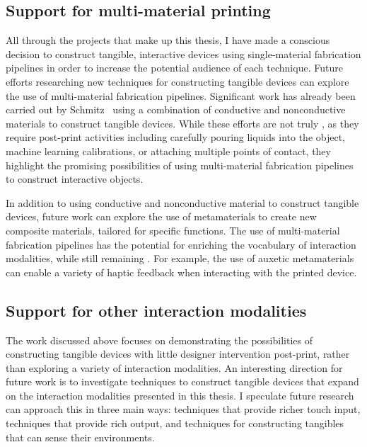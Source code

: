     \subsection{Support for multi-material printing}
      All through the projects that make up this thesis, I have made a conscious
      decision to construct tangible, interactive devices using single-material
      fabrication pipelines in order to increase the potential audience of each
      technique. Future efforts researching new \pap techniques for constructing
      tangible devices can explore the use of multi-material fabrication
      pipelines. Significant work has already been carried out by
      Schmitz~\cite{Schmitz:2019a} using a combination of conductive and
      nonconductive materials to construct tangible devices. While these efforts
      are not truly \pap, as they require post-print activities including
      carefully pouring liquids into the object, machine learning
      calibrations, or attaching multiple points of contact, they highlight the
      promising possibilities of using multi-material fabrication pipelines to
      construct interactive objects.

      In addition to using conductive and nonconductive material to construct
      tangible devices, future work can explore the use of metamaterials to
      create new composite materials, tailored for specific functions.  The use
      of multi-material fabrication pipelines has the potential for enriching
      the vocabulary of interaction modalities, while still remaining \pap.  For
      example, the use of auxetic metamaterials can enable a variety of haptic
      feedback when interacting with the printed device.

    \subsection{Support for other interaction modalities}
      The work discussed above focuses on demonstrating the possibilities of
      constructing tangible devices with little designer intervention
      post-print, rather than exploring a variety of interaction modalities. An
      interesting direction for future work is to investigate \papf techniques
      to construct tangible devices that expand on the interaction modalities
      presented in this thesis. I speculate future research can approach this in
      three main ways: techniques that provide richer touch input, techniques
      that provide rich output, and techniques for constructing tangibles that
      can sense their environments.

